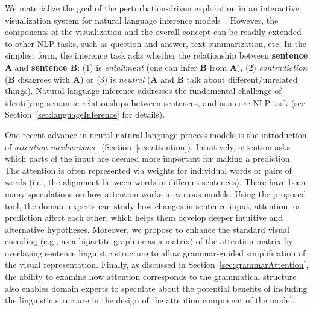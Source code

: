 We materialize the goal of the perturbation-driven exploration in an interactive visualization system for natural language inference models~\cite{Parikh2016}.
However, the components of the visualization and the overall concept can be readily extended to other NLP tasks, such as question and answer, text summarization, etc.
%
In the simplest form, the inference task asks whether the
relationship between \textbf{sentence A} and \textbf{sentence B}: (1) is \emph{entailment} (one can infer \textbf{B} from \textbf{A}), (2) \emph{contradiction} (\textbf{B} disagrees with \textbf{A}) or (3) is \emph{neutral} (\textbf{A} and \textbf{B} talk about different/unrelated things).
Natural language inference addresses the fundamental challenge of identifying semantic relationships between sentences, and is a core NLP task (see Section~\ref{sec:languageInference} for details).

One recent advance in neural natural language process models is the
introduction of \emph{attention
  mechanisms}~\cite{bahdanau2014neural,VaswaniShazeerParmar2017}
(Section~\ref{sec:attention}). Intuitively, attention asks which parts of the
input are deemed more important for making a prediction. The attention is often represented via weights for individual words or pairs of words (i.e., the alignment between words in different sentences).
%
There have been many speculations on how attention works in various models.
Using the proposed tool, the domain experts can study how changes in sentence input, attention, or prediction affect each other, which helps them develop deeper intuitive and alternative hypotheses. 
Moreover, we propose to enhance the standard visual encoding (e.g., as a bipartite graph or as a matrix) of the attention matrix by overlaying sentence linguistic structure to allow grammar-guided simplification of the visual representation.
%
Finally, as discussed in Section~\ref{sec:grammarAttention}, the ability to examine how attention corresponds to the grammatical structure also enables domain experts to speculate about the potential benefits of including the linguistic structure in the design of the attention component of the model.

